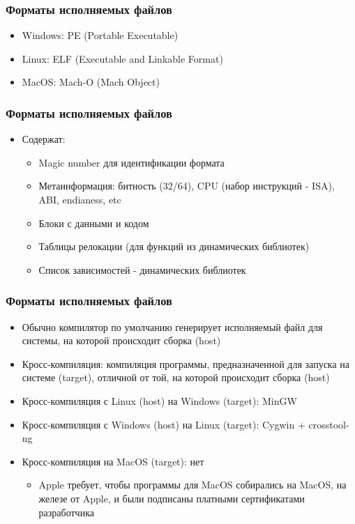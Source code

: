 \documentclass{beamer}
\begin{document}
\begin{frame}[fragile]
\frametitle{Форматы исполняемых файлов}
\begin{itemize}
\item Windows: PE (Portable Executable)
\item Linux: ELF (Executable and Linkable Format)
\item MacOS: Mach-O (Mach Object)
\end{itemize}
\end{frame}

\begin{frame}[fragile]
\frametitle{Форматы исполняемых файлов}
\begin{itemize}
\item Содержат:
\pause
\begin{itemize}
\item Magic number для идентификации формата
\pause
\item Метаинформация: битность (32/64), CPU (набор инструкций - ISA), ABI, endianess, etc
\pause
\item Блоки с данными и кодом
\pause
\item Таблицы релокации (для функций из динамических библиотек)
\pause
\item Список зависимостей - динамических библиотек
\end{itemize}
\end{itemize}
\end{frame}

\begin{frame}[fragile]
\frametitle{Форматы исполняемых файлов}
\begin{itemize}
\item Обычно компилятор по умолчанию генерирует исполняемый файл для системы, на которой происходит сборка (host)
\pause
\item Кросс-компиляция: компиляция программы, предназначенной для запуска на системе (target), отличной от той, на которой происходит сборка (host)
\pause
\item Кросс-компиляция с Linux (host) на Windows (target): MinGW
\pause
\item Кросс-компиляция с Windows (host) на Linux (target): Cygwin + crosstool-ng
\pause
\item Кросс-компиляция на MacOS (target): нет
\begin{itemize}
\item Apple требует, чтобы программы для MacOS собирались на MacOS, на железе от Apple, и были подписаны платными сертификатами разработчика
\end{itemize}
\end{itemize}
\end{frame}
\end{document}
